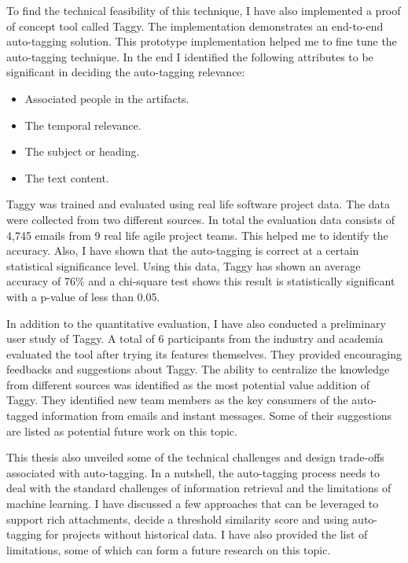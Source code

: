 To find the technical feasibility of this technique, I have also implemented a proof of concept tool called Taggy. The implementation demonstrates an end-to-end auto-tagging solution. This prototype implementation helped me to fine tune the auto-tagging technique. In the end I identified the following attributes to be significant in deciding the auto-tagging relevance:
\begin{itemize}
	\item Associated people in the artifacts.
	\item The temporal relevance.
	\item The subject or heading.
	\item The text content.	
\end{itemize}

Taggy was trained and evaluated using real life software project data. The data were collected from two different sources. In total the evaluation data consists of 4,745 emails from 9 real life agile project teams.  This helped me to identify the accuracy. Also, I have shown that the auto-tagging is correct at a certain statistical significance level. Using this data, Taggy has shown an average accuracy of 76\% and a chi-square test shows this result is statistically significant with a p-value of less than 0.05.

In addition to the quantitative evaluation, I have also conducted a preliminary user study of Taggy. A total of 6 participants from the industry and academia evaluated the tool after trying its features themselves. They provided encouraging feedbacks and suggestions about Taggy. The ability to centralize the knowledge from different sources was identified as the most potential value addition of Taggy. They identified new team members as the key consumers of the auto-tagged information from emails and instant messages. Some of their suggestions are listed as potential future work on this topic.

This thesis also unveiled some of the technical challenges and design trade-offs associated with auto-tagging. In a nutshell, the auto-tagging process needs to deal with the standard challenges of information retrieval and the limitations of machine learning. I have discussed a few approaches that can be leveraged to support rich attachments, decide a threshold similarity score and using auto-tagging for projects without historical data. I have also provided the list of limitations, some of which can form a future research on this topic.

